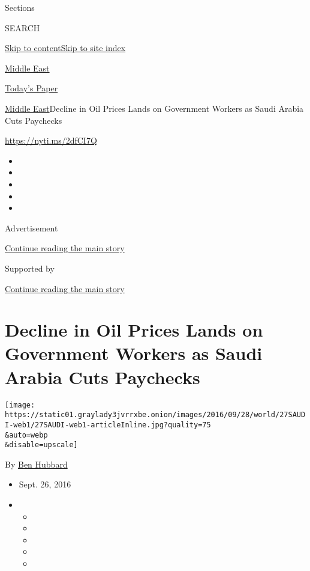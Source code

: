 Sections

SEARCH

\protect\hyperlink{site-content}{Skip to
content}\protect\hyperlink{site-index}{Skip to site index}

\href{https://www.nytimes3xbfgragh.onion/section/world/middleeast}{Middle
East}

\href{https://myaccount.nytimes3xbfgragh.onion/auth/login?response_type=cookie\&client_id=vi}{}

\href{https://www.nytimes3xbfgragh.onion/section/todayspaper}{Today's
Paper}

\href{/section/world/middleeast}{Middle East}\textbar{}Decline in Oil
Prices Lands on Government Workers as Saudi Arabia Cuts Paychecks

\url{https://nyti.ms/2dfCI7Q}

\begin{itemize}
\item
\item
\item
\item
\item
\end{itemize}

Advertisement

\protect\hyperlink{after-top}{Continue reading the main story}

Supported by

\protect\hyperlink{after-sponsor}{Continue reading the main story}

\hypertarget{decline-in-oil-prices-lands-on-government-workers-as-saudi-arabia-cuts-paychecks}{%
\section{Decline in Oil Prices Lands on Government Workers as Saudi
Arabia Cuts
Paychecks}\label{decline-in-oil-prices-lands-on-government-workers-as-saudi-arabia-cuts-paychecks}}

\texttt{[image: https://static01.graylady3jvrrxbe.onion/images/2016/09/28/world/27SAUDI-web1/27SAUDI-web1-articleInline.jpg?quality=75\\\&auto=webp\\\&disable=upscale]}

By \href{http://www.nytimes3xbfgragh.onion/by/ben-hubbard}{Ben Hubbard}

\begin{itemize}
\item
  Sept. 26, 2016
\item
  \begin{itemize}
  \item
  \item
  \item
  \item
  \item
  \end{itemize}
\end{itemize}

